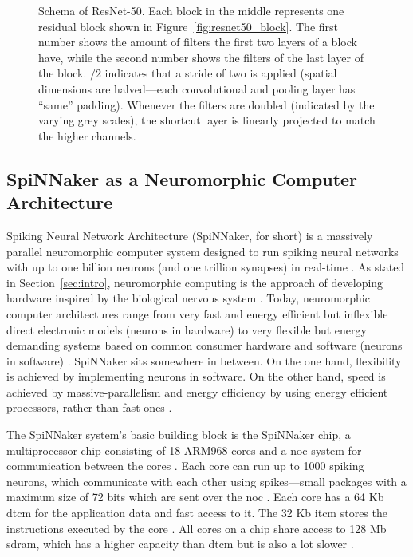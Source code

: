 \documentclass[]{article}
\begin{document}
\begin{figure}
\begin{center}
  \end{center}
  \caption{Schema of ResNet-50. Each block in the middle represents
    one residual block shown in Figure~\ref{fig:resnet50_block}.
    The first number shows the amount of filters the first two layers
    of a block have, while the second number shows the filters of the
    last layer of the block. $/2$ indicates that a stride of two is
    applied (spatial dimensions are halved---each convolutional and
    pooling layer has ``same'' padding). Whenever the filters are
    doubled (indicated by the varying grey scales), the shortcut layer
    is linearly projected to match the higher channels.}
  \label{fig:resnet50}
\end{figure}



\subsection{SpiNNaker as a Neuromorphic Computer Architecture} %
\label{subsec:intro_spinn}

Spiking Neural Network Architecture (SpiNNaker, for short) is a
massively parallel neuromorphic computer system designed to run
spiking neural networks with up to one billion neurons (and one
trillion synapses) in real-time \citep{painkras_et_al_2013}.
As stated in Section~\ref{sec:intro}, neuromorphic computing is
the approach of developing hardware inspired by the biological
nervous system \citep{mead_1989}.
Today, neuromorphic computer architectures range from very fast and
energy efficient but inflexible direct electronic models
(neurons in hardware) \citep{indiveri_et_al_2011} to very flexible but
energy demanding systems based on common consumer hardware and
software (neurons in software) \citep{plesser_et_al_2007}.
SpiNNaker sits somewhere in between.
On the one hand, flexibility is achieved by implementing neurons in
software.
On the other hand, speed is achieved by massive-parallelism and
energy efficiency by using energy efficient processors, rather than
fast ones \citep{furber_et_al_2020}.

The SpiNNaker system's basic building block is the SpiNNaker chip,
a multiprocessor chip consisting of 18 ARM968 cores
\citep{furber_et_al_2020} and a
\acrfull{noc} system for communication between the cores
\citep{furber_et_al_2007}.
Each core can run up to 1000 spiking neurons, which communicate with
each other using spikes---small packages with a maximum size of 72 bits
which are sent over the \acrshort{noc} \citep{furber_et_al_2007, spinnaker_2020}.
Each core has a 64 Kb \acrfull{dtcm} for the
application data and fast access to it.
The 32 Kb \acrfull{itcm} stores the instructions executed by the core
\citep{furber_et_al_2020}.
All cores on a chip share access to 128 Mb \acrfull{sdram}, which has
a higher capacity than \acrshort{dtcm} but is also a lot slower
\citep{furber_et_al_2020, spinnaker_2020a}.
\end{document}
